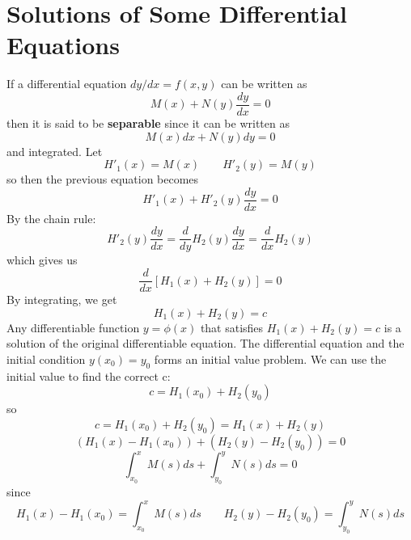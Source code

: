\section{Solutions of Some Differential Equations}
    If a differential equation $dy/dx = f(x, y)$ can be written as 
    \begin{equation*}
        M(x) + N(y)\frac{dy}{dx} = 0
    \end{equation*}
    then it is said to be \textbf{separable} since it can be written as $$M(x)dx + N(y)dy = 0$$ and integrated.
    \newline \indent
    Let
    \begin{equation*}
        H'_1(x) = M(x) \qquad H'_2(y) = M(y)
    \end{equation*}
    so then the previous equation becomes
    \begin{equation*}
        H'_1(x) + H'_2(y)\frac{dy}{dx} = 0
    \end{equation*}
    By the chain rule:
    \begin{equation*}
        H'_2(y)\frac{dy}{dx} = \frac{d}{dy}H_2(y)\frac{dy}{dx} = \frac{d}{dx}H_2(y)
    \end{equation*}
    which gives us
    \begin{equation*}
        \frac{d}{dx}[H_1(x) + H_2(y)] = 0
    \end{equation*}
    By integrating, we get
    \begin{equation*}
        H_1(x) + H_2(y) = c
    \end{equation*}
    Any differentiable function $y = \phi(x)$ that satisfies $H_1(x) + H_2(y) = c$ is a solution of the original differentiable equation. The differential equation and the initial condition $y(x_0) = y_0$ forms an initial value problem. We can use the initial value to find the correct c:
    \begin{equation*}
        c = H_1(x_0) + H_2(y_0)
    \end{equation*}
    so
    \begin{equation*}
        c = H_1(x_0) + H_2(y_0) = H_1(x) + H_2(y)
    \end{equation*}
    \begin{equation*}
        (H_1(x) - H_1(x_0)) + (H_2(y) - H_2(y_0)) = 0
    \end{equation*}
    \begin{equation*}
        \int_{x_0}^x M(s) ds + \int_{y_0}^y N(s) ds = 0
    \end{equation*}
    since 
    \begin{equation*}
        H_1(x) - H_1(x_0) = \int_{x_0}^x M(s) ds \qquad H_2(y) - H_2(y_0) = \int_{y_0}^y N(s) ds
    \end{equation*}
